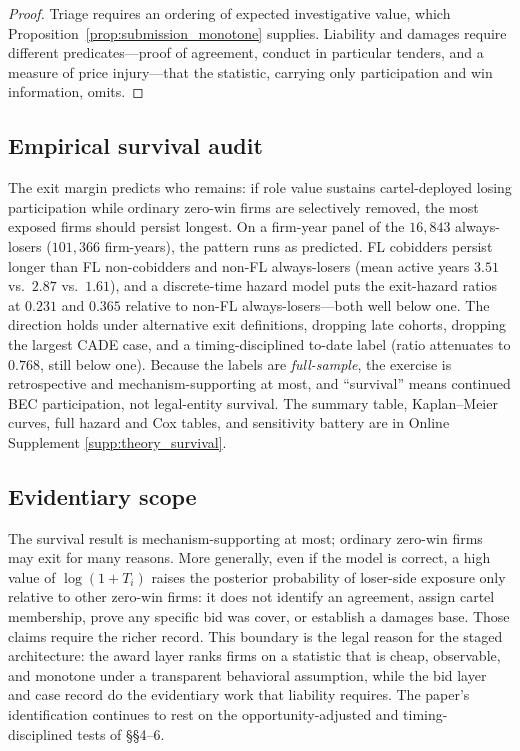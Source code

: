 \begin{proof}
Triage requires an ordering of expected investigative value, which
Proposition~\ref{prop:submission_monotone} supplies. Liability and damages
require different predicates---proof of agreement, conduct in particular
tenders, and a measure of price injury---that the statistic, carrying only
participation and win information, omits.
\end{proof}

\subsection{Empirical survival audit}
\label{app:framework_survival}

The exit margin predicts who remains: if role value sustains
cartel-deployed losing participation while ordinary zero-win firms are
selectively removed, the most exposed firms should persist longest. On a
firm-year panel of the $16{,}843$ always-losers ($101{,}366$
firm-years), the pattern runs as predicted. FL cobidders persist longer
than FL non-cobidders and non-FL always-losers (mean active years $3.51$
vs.\ $2.87$ vs.\ $1.61$), and a discrete-time hazard model puts the
exit-hazard ratios at $0.231$ and $0.365$ relative to non-FL
always-losers---both well below one. The direction holds under
alternative exit definitions, dropping late cohorts, dropping the
largest CADE case, and a timing-disciplined to-date label (ratio
attenuates to $0.768$, still below one). Because the labels are
\emph{full-sample}, the exercise is retrospective and
mechanism-supporting at most, and ``survival'' means continued BEC
participation, not legal-entity survival. The summary table,
Kaplan--Meier curves, full hazard and Cox tables, and sensitivity
battery are in Online Supplement \ref{supp:theory_survival}.

\subsection{Evidentiary scope}
\label{app:framework_scope}

The survival result is mechanism-supporting at most; ordinary zero-win
firms may exit for many reasons. More generally, even if the model is
correct, a high value of $\log(1+T_i)$ raises the posterior probability
of loser-side exposure only relative to other zero-win firms: it does
not identify an agreement, assign cartel membership, prove any specific
bid was cover, or establish a damages base. Those claims require the
richer record. This boundary is the legal reason for the staged
architecture: the award layer ranks firms on a statistic that is cheap,
observable, and monotone under a transparent behavioral assumption,
while the bid layer and case record do the evidentiary work that
liability requires. The paper's identification continues to rest on the
opportunity-adjusted and timing-disciplined tests of \S\S4--6.

